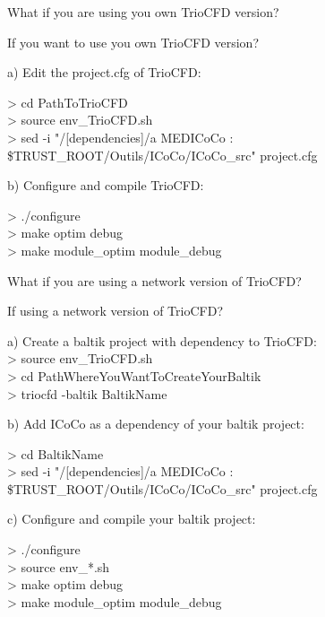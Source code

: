 \documentclass[10pt, hyperref={unicode=true,pdfusetitle, bookmarks=true,bookmarksnumbered=false,bookmarksopen=false, breaklinks=false,pdfborder={0 0 1},backref=true,colorlinks=true,linkcolor=darkblue,pageanchor, urlcolor=darkblue}]{beamer}
\begin{document}
\begin{frame}{What if you are using you own TrioCFD version?}

\begin{block}{If you want to use you own TrioCFD version?}

a) Edit the project.cfg of TrioCFD:\\
\begin{tiny}
    > cd PathToTrioCFD \\
    > source env\_TrioCFD.sh \\
    > sed -i "/[dependencies]/a MEDICoCo : \$TRUST\_ROOT/Outils/ICoCo/ICoCo\_src" project.cfg
\end{tiny}
\end{block}

\begin{block}{}
b) Configure and compile TrioCFD:\\
\begin{tiny}
> ./configure \\
> make optim debug \\
> make module\_optim module\_debug
\end{tiny}
\end{block}

\end{frame}
\begin{frame}{What if you are using a network version of TrioCFD?}

\begin{block}{If using a network version of TrioCFD?}

a) Create a baltik project with dependency to TrioCFD:\\
    > source env\_TrioCFD.sh \\
    > cd PathWhereYouWantToCreateYourBaltik\\
    > triocfd -baltik BaltikName \\
\end{block}

\begin{block}{}
b) Add ICoCo as a dependency of your baltik project:\\
\begin{tiny}
    > cd BaltikName \\
    > sed -i "/[dependencies]/a MEDICoCo : \$TRUST\_ROOT/Outils/ICoCo/ICoCo\_src" project.cfg
\end{tiny}
\end{block}

\begin{block}{}
c) Configure and compile your baltik project:\\
\begin{tiny}
> ./configure \\
> source env\_*.sh \\
> make optim debug \\
> make module\_optim module\_debug
\end{tiny}
\end{block}
\end{frame}
\end{document}
